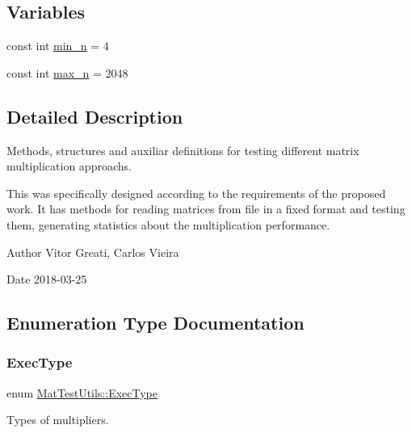 \subsection*{Variables}
\begin{DoxyCompactItemize}
\item 
const int \mbox{\hyperlink{namespaceMatTestUtils_ac809b72319e3d38f960650baf31dc1e6}{min\+\_\+n}} = 4
\item 
const int \mbox{\hyperlink{namespaceMatTestUtils_aae57ce6440d799106e6f95f6094b2d6d}{max\+\_\+n}} = 2048
\end{DoxyCompactItemize}


\subsection{Detailed Description}
Methods, structures and auxiliar definitions for testing different matrix multiplication approachs. 

This was specifically designed according to the requirements of the proposed work. It has methods for reading matrices from file in a fixed format and testing them, generating statistics about the multiplication performance.

\begin{DoxyAuthor}{Author}
Vitor Greati, Carlos Vieira 
\end{DoxyAuthor}
\begin{DoxyDate}{Date}
2018-\/03-\/25 
\end{DoxyDate}


\subsection{Enumeration Type Documentation}
\mbox{\label{namespaceMatTestUtils_a8ce892071d861e65dd62ef377efaaa6b}} 
\subsubsection{\texorpdfstring{Exec\+Type}{ExecType}}
{\footnotesize\ttfamily enum \mbox{\hyperlink{namespaceMatTestUtils_a8ce892071d861e65dd62ef377efaaa6b}{Mat\+Test\+Utils\+::\+Exec\+Type}}}



Types of multipliers. 

